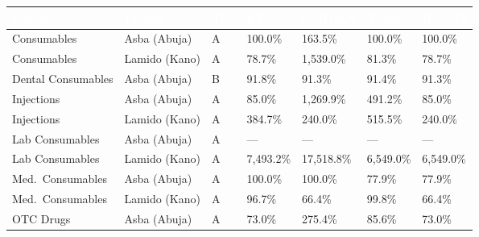 \documentclass[12pt, a4paper]{article}
\begin{document}
\noindent
\begin{tabularx}{\textwidth}{@{} L{3.6cm} L{3.2cm} C{0.7cm} R{1.6cm} R{1.8cm} R{1.5cm} R{1.6cm} @{}}
  \toprule
  \textcolor{white}{\textbf{Category}} &
  \textcolor{white}{\textbf{Facility}} &
  \textcolor{white}{\textbf{Tier}} &
  \textcolor{white}{\textbf{ETS}} &
  \textcolor{white}{\textbf{SARIMA}} &
  \textcolor{white}{\textbf{Theta}} &
  \textcolor{white}{\textbf{Best T2}} \\
  \midrule

  Consumables & Asba (Abuja) & A &
    100.0\% &
    163.5\% &
    100.0\% &
    100.0\% \\
  Consumables & Lamido (Kano) & A &
    78.7\% &
    1{,}539.0\% &
    81.3\% &
    78.7\% \\

  Dental Consumables & Asba (Abuja) & B &
    91.8\% &
    91.3\% &
    91.4\% &
    91.3\% \\
  Injections & Asba (Abuja) & A &
    85.0\% &
    1{,}269.9\% &
    491.2\% &
    85.0\% \\

  Injections & Lamido (Kano) & A &
    384.7\% &
    240.0\% &
    515.5\% &
    240.0\% \\
  Lab Consumables & Asba (Abuja) & A &
    --- &
    --- &
    --- &
    --- \\

  Lab Consumables & Lamido (Kano) & A &
    7{,}493.2\% &
    17{,}518.8\% &
    6{,}549.0\% &
    6{,}549.0\% \\
  Med.\ Consumables & Asba (Abuja) & A &
    100.0\% &
    100.0\% &
    77.9\% &
    77.9\% \\

  Med.\ Consumables & Lamido (Kano) & A &
    96.7\% &
    66.4\% &
    99.8\% &
    66.4\% \\
  OTC Drugs & Asba (Abuja) & A &
    73.0\% &
    275.4\% &
    85.6\% &
    73.0\% \\


\end{tabularx}
\end{document}
